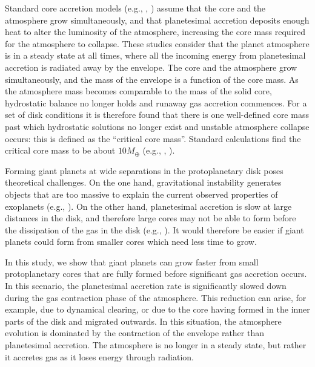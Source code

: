 \documentclass[apj]{emulateapj}
\begin{document}
Standard core accretion models (e.g., \citealt{stevenson82}, \citealt{rafikov06}) assume that the core and the atmosphere grow simultaneously, and that planetesimal accretion deposits enough heat to alter the luminosity of the atmosphere, increasing the core mass required for the atmosphere to collapse. These studies consider that the planet atmosphere is in a steady state at all times, where all the incoming energy from planetesimal accretion is radiated away by the envelope. The core and the atmosphere grow simultaneously, and the mass of the envelope is a function of the core mass. As the atmosphere mass becomes comparable to the mass of the solid core, hydrostatic balance no longer holds and runaway gas accretion commences. For a set of disk conditions it is therefore found that there is one well-defined core mass past which hydrostatic solutions no longer exist and unstable atmosphere collapse occurs: this is defined as the ``critical core mass''.  Standard calculations find the critical core mass to be about $10 M_{\oplus}$ (e.g., \citealt{stevenson82}, \citealt{rafikov06}).


Forming giant planets at wide separations in the protoplanetary disk poses theoretical challenges. On the one hand, gravitational instability generates objects that are too massive to explain the current observed properties of exoplanets (e.g., \citealt{rafikov05}). On the other hand, planetesimal accretion is slow at large distances in the disk, and therefore large cores may not be able to form before the dissipation of the gas in the disk (e.g., \citealt{rafikov06}). It would therefore be easier if giant planets could form from smaller cores which need less time to grow. 

In this study, we show that giant planets can grow faster from small protoplanetary cores that are fully formed before significant gas accretion occurs. In this scenario, the planetesimal accretion rate is significantly slowed down during the gas contraction phase of the atmosphere. This reduction can arise, for example, due to dynamical clearing, or due to the core having formed in the inner parts of the disk and migrated outwards. In this situation, the atmosphere evolution is dominated by the contraction of the envelope rather than planetesimal accretion. The atmosphere is no longer in a steady state, but rather it accretes gas as it loses energy through radiation. 
\end{document}
